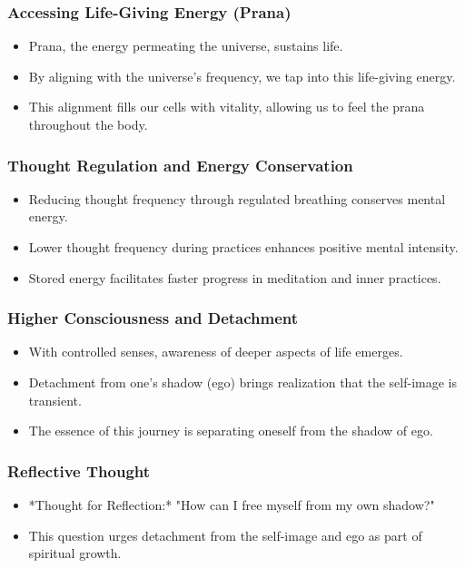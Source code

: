 \begin{frame}[fragile]\frametitle{Accessing Life-Giving Energy (Prana)}
    \begin{itemize}
        \item Prana, the energy permeating the universe, sustains life.
        \item By aligning with the universe's frequency, we tap into this life-giving energy.
        \item This alignment fills our cells with vitality, allowing us to feel the prana throughout the body.
    \end{itemize}
\end{frame}

\begin{frame}[fragile]\frametitle{Thought Regulation and Energy Conservation}
    \begin{itemize}
        \item Reducing thought frequency through regulated breathing conserves mental energy.
        \item Lower thought frequency during practices enhances positive mental intensity.
        \item Stored energy facilitates faster progress in meditation and inner practices.
    \end{itemize}
\end{frame}

\begin{frame}[fragile]\frametitle{Higher Consciousness and Detachment}
    \begin{itemize}
        \item With controlled senses, awareness of deeper aspects of life emerges.
        \item Detachment from one's shadow (ego) brings realization that the self-image is transient.
        \item The essence of this journey is separating oneself from the shadow of ego.
    \end{itemize}
\end{frame}

\begin{frame}[fragile]\frametitle{Reflective Thought}
    \begin{itemize}
        \item *Thought for Reflection:* "How can I free myself from my own shadow?"
        \item This question urges detachment from the self-image and ego as part of spiritual growth.
    \end{itemize}
\end{frame}



